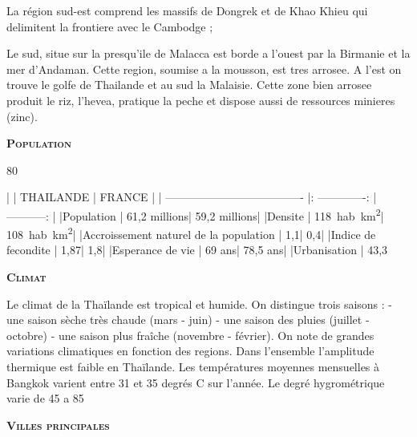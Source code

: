\begin{multicols}{2}
La région sud-est comprend les massifs de Dongrek et de Khao Khieu qui delimitent la frontiere avec le Cambodge ;

Le sud, situe sur la presqu’ile de Malacca est borde a l’ouest par la Birmanie et la mer d’Andaman. Cette region, soumise a la mousson, est tres arrosee. A l’est on trouve le golfe de Thailande et au sud la Malaisie. Cette zone bien arrosee produit le riz, l’hevea, pratique la peche et dispose aussi de ressources minieres (zinc).

\textbf{\textsc{Population}}

80%

|                                       |     THAILANDE   |    FRANCE    |
| ------------------------------------- |: -------------: | -----------: |
|Population                             |    61,2 millions| 59,2 millions|
|Densite                                |      \SI{118}{hab.km^2}|   \SI{108}{hab.km^2}|
|Accroissement naturel de la population |              1,1|           0,4|
|Indice de fecondite                    |             1,87|           1,8|
|Esperance de vie                       |           69 ans|      78,5 ans|
|Urbanisation                           |           43,3 %

\textbf{\textsc{Climat}}

Le climat de la Thaïlande est tropical et humide. On distingue trois saisons :
- une saison sèche très chaude (mars - juin)
- une saison des pluies (juillet - octobre)
- une saison plus fraîche (novembre - février).
On note de grandes variations climatiques en fonction des regions. Dans l’ensemble l’amplitude thermique est faible en Thaïlande. Les températures moyennes mensuelles à Bangkok varient entre 31 et 35 degrés C sur l’année. Le degré hygrométrique varie de 45 a 85%

\textbf{\textsc{Villes principales}}


\end{multicols}
